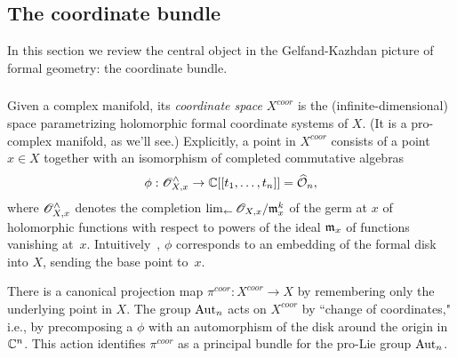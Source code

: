 \subsection{The coordinate bundle}

In this section we review the central object in the Gelfand-Kazhdan
picture of formal geometry: the coordinate bundle.


\subsubsection{}

Given a complex manifold, its {\em coordinate space} $X^{coor}$ is the (infinite-dimensional) space parametrizing holomorphic formal coordinate systems of $X$. 
(It is a pro-complex manifold, as we'll see.) 
Explicitly, a point in $X^{coor}$ consists of a point $x \in X$ 
together with an isomorphism of completed commutative algebras 
\[
\phi: \mathscr O_{X,x}^\wedge \to \mathbb C[[t_1,\ldots,t_n]] = \widehat{\mathcal O}_n,
\]
where $\mathscr O_{X,x}^\wedge$ denotes the completion $\lim_{\leftarrow} \mathscr O_{X,x}/{\mathfrak m}_x^k$ of the germ at $x$ of holomorphic functions with respect to powers of the ideal ${\mathfrak m}_x$ of functions vanishing at~$x$. \si 
Intuitively, $\phi$ corresponds to an embedding of the formal disk into $X$, sending the base point to~$x$.

There is a canonical projection map $\pi^{coor} : X^{coor} \to X$ by remembering only the underlying point in $X$. 
The group ${\rm Aut}_n$ acts on $X^{coor}$ by ``change of coordinates," 
i.e., by precomposing a  $\phi$ with an automorphism of the disk around the origin in $\mathbb C^n$.
This action identifies $\pi^{coor}$ as a principal bundle for the pro-Lie group ${\rm Aut}_n$. 

